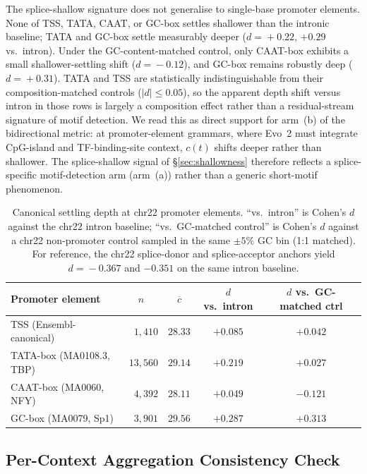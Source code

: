 \documentclass{article}
\theoremstyle{plain}
\theoremstyle{definition}
\theoremstyle{remark}
\begin{document}
The splice-shallow signature does not generalise to single-base
promoter elements. None of TSS, TATA, CAAT, or GC-box settles shallower
than the intronic baseline; TATA and GC-box settle measurably deeper
($d\!=\!+0.22$, $+0.29$ vs.\ intron). Under the GC-content-matched
control, only CAAT-box exhibits a small shallower-settling shift
($d\!=\!-0.12$), and GC-box remains robustly deep ($d\!=\!+0.31$). TATA
and TSS are statistically indistinguishable from their
composition-matched controls ($|d|\!\le\!0.05$), so the apparent depth
shift versus intron in those rows is largely a composition effect
rather than a residual-stream signature of motif detection. We read
this as direct support for arm~(b) of the bidirectional metric: at
promoter-element grammars, where Evo~2 must integrate CpG-island and
TF-binding-site context, $c(t)$ shifts deeper rather than shallower.
The splice-shallow signal of \S\ref{sec:shallowness} therefore reflects
a splice-specific motif-detection arm (arm~(a)) rather than a generic
short-motif phenomenon.

\begin{table}[!htbp]
  \caption{Canonical settling depth at chr22 promoter elements. ``vs.\ intron''
    is Cohen's $d$ against the chr22 intron baseline; ``vs.\ GC-matched
    control'' is Cohen's $d$ against a chr22 non-promoter control
    sampled in the same $\pm 5\%$ GC bin (1:1 matched). For reference,
    the chr22 splice-donor and splice-acceptor anchors yield
    $d\!=\!-0.367$ and $-0.351$ on the same intron baseline.}
  \label{tab:promoter-elements}
  \centering
  \small
  \begin{tabular}{@{}lcccc@{}}
    \toprule
    Promoter element & $n$ & $\overline{c}$ & $d$ vs.\ intron & $d$ vs.\ GC-matched ctrl \\
    \midrule
    TSS (Ensembl-canonical)    & $\phantom{00}{1{,}410}$ & $28.33$ & $+0.085$ & $+0.042$ \\
    TATA-box (MA0108.3, TBP)   & $\phantom{0}{13{,}560}$ & $29.14$ & $+0.219$ & $+0.027$ \\
    CAAT-box (MA0060, NFY)     & $\phantom{00}{4{,}392}$ & $28.11$ & $+0.049$ & $-0.121$ \\
    GC-box (MA0079, Sp1)       & $\phantom{00}{3{,}901}$ & $29.56$ & $+0.287$ & $+0.313$ \\
    \bottomrule
  \end{tabular}
\end{table}

\subsection{Per-Context Aggregation Consistency Check}
\label{app:agg-sanity}
\end{document}
